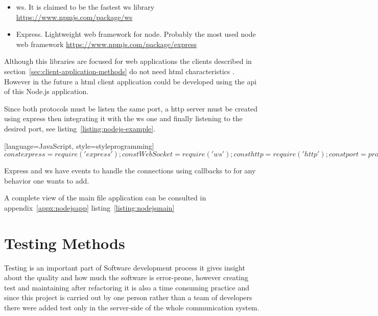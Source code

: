 \documentclass[hidelinks,11pt,a4paper,oneside,article]{memoir}
\begin{document}
\begin{itemize}
    \item ws. It is claimed to be the fastest \gls{ws} library \url{https://www.npmjs.com/package/ws}
    \item Express. Lightweight web framework for node. Probably the most used node web framework \url{https://www.npmjs.com/package/express}
\end{itemize}
Although this libraries are focused for web applications the clients described in section~\ref{sec:client-application-methods} do not need \gls{html} characteristics . However in the future a \gls{html} client application could be developed using the \gls{api} of this Node.js application.

Since both protocols must be listen the same port, a \gls{http} server must be created using express then integrating it with the \gls{ws} one and finally listening to the desired port, see listing~\ref{listing:nodejs-example}.

[language=JavaScript, style=styleprogramming]$
const express = require('express');
const WebSocket = require('ws');
const http = require('http');

const port = process.env.PORT
const ip = '0.0.0.0';

/* http server */
const express = express();
const server = http.createServer(express);
    // ... handle http requests ...

/* websocket server extends the http server */
var wss = new WebSocket.Server({
    server: server,
    // other websocket configuration ...
});

 wss.on('connection', function connection(ws) {
    // ... handle websocket requests ...
});

server.listen(port, ip);
$

Express and ws have events to handle the connections using callbacks to for any behavior one wants to add.

A complete view of the main file application can be consulted in appendix~\ref{appx:nodejsapp} listing~\ref{listing:nodejsmain}



\section{Testing Methods}
Testing is an important part of Software development process it gives insight about the quality and how much the software is error-prone, however creating test and maintaining after refactoring it is also a time consuming practice and since this project is carried out by one person rather than a team of developers there were added test only in the server-side of the whole communication system.
\end{document}
